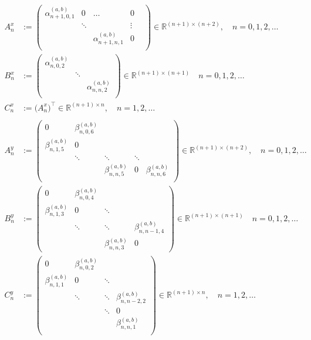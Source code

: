 \documentclass[11pt, oneside]{article}   	%
\newcommand{\R}{\mathbb{R}}
\newcommand{\alphaab}{\alpha^{(a,b)}}
\newcommand{\betaab}{\beta^{(a,b)}}
\begin{document}
\begin{align*}
A^x_n &:= \begin{pmatrix}
		\alphaab_{n+1,0,1} & 0 & \hdots & 0 \\
		& \ddots & & \vdots & \\
		& & \alphaab_{n+1,n,1} & 0 \\
	    \end{pmatrix} \in \R^{(n+1)\times(n+2)}, \quad n = 0,1,2,\dots \\
B^x_n &:= \begin{pmatrix}
		\alphaab_{n,0,2} & & \\
		& \ddots & \\
		& & \alphaab_{n,n,2} \\
	    \end{pmatrix} \in \R^{(n+1)\times(n+1)} \quad n = 0,1,2,\dots \\
C^x_n &:= \big( A^x_n \big)^\top \in \R^{(n+1)\times n},  \quad n = 1,2,\dots \\ 
\nonumber \\
A^y_n &:= \begin{pmatrix}
		0 & \betaab_{n,0,6} & & & \\
		\betaab_{n,1,5} & 0 & & & \\
		& \ddots & \ddots & \ddots & \\
		& & \betaab_{n,n,5}& 0 & \betaab_{n,n,6} \\
	    \end{pmatrix} \in \R^{(n+1)\times(n+2)}, \quad n = 0,1,2,\dots \\
B^y_n &:= \begin{pmatrix}
		0 & \betaab_{n,0,4} & & \\
		\betaab_{n,1,3} & 0 & \ddots & \\
		& \ddots & \ddots & \betaab_{n,n-1,4} \\
		& & \betaab_{n,n,3} & 0
	    \end{pmatrix} \in \R^{(n+1)\times(n+1)}  \quad n = 0,1,2,\dots \\
C^y_n &:= \begin{pmatrix}
		0 & \betaab_{n,0,2} & & \\
		\betaab_{n,1,1} & 0 & \ddots & \\
		& \ddots & \ddots & \betaab_{n,n-2,2} \\
		& & \ddots & 0 \\
		& & & \betaab_{n,n,1} \\
	    \end{pmatrix} \in \R^{(n+1)\times n}, \quad n = 1,2,\dots
\end{align*}
\end{document}
